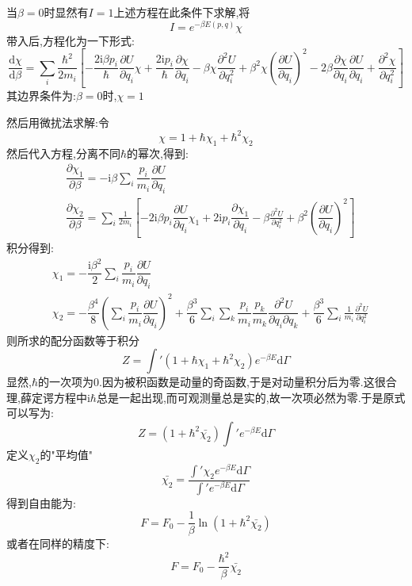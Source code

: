 当$\beta=0$时显然有$I=1$上述方程在此条件下求解,将
\begin{equation}
  I=e^{-\beta E(p,q)} \chi
\end{equation}
带入后,方程化为一下形式:
\begin{equation}
  \dfrac{\mathrm{d}\chi}{\mathrm{d} \beta}=\sum_i \frac{\hbar^{2}}{2m_i}\left[ -\dfrac{2\mathrm{i} \beta p_i}{\hbar}\dfrac{\partial U}{\partial q_i}\chi+\dfrac{2\mathrm{i} p_i}{\hbar}\dfrac{\partial \chi}{\partial q_i}-\beta\chi\frac{\partial^2 U}{\partial q_i^2}+\beta^{2}\chi\left( \dfrac{\partial U}{\partial q_i} \right) ^{2}-2\beta \dfrac{\partial \chi}{\partial q_i}\dfrac{\partial U}{\partial q_i}+\frac{\partial^2 \chi}{\partial q_i^2} \right] 
\end{equation}
其边界条件为:$\beta=0$时,$\chi=1$

然后用微扰法求解:令
\begin{equation}
  \chi=1+\hbar\chi_1+\hbar^{2}\chi_2
\end{equation}
然后代入方程,分离不同$\hbar$的幂次,得到:
\begin{align}
&\dfrac{\partial \chi_1}{\partial \beta}=-\mathrm{i} \beta\sum_i \dfrac{p_i}{m_i}\dfrac{\partial U}{\partial q_i} \\ 
&\dfrac{\partial \chi_2}{\partial \beta}=\sum_i \frac{1}{2m_i}\left[ -2\mathrm{i} \beta p_i \dfrac{\partial U}{\partial q_i}\chi_1+2\mathrm{i} p_i \dfrac{\partial \chi_1}{\partial q_i}-\beta \frac{\partial^2 U}{\partial q_i^2}+\beta^{2} \left( \dfrac{\partial U}{\partial q_i} \right) ^{2} \right]
\end{align}
积分得到:
\begin{align}
&\chi_1=-\dfrac{\mathrm{i} \beta^{2}}{2}\sum_i \dfrac{p_i}{m_i}\dfrac{\partial U}{\partial q_i} \\ 
&\chi_2=-\dfrac{\beta^{4}}{8}\left( \sum_i \dfrac{p_i}{m_i}\dfrac{\partial U}{\partial q_i}
 \right) ^{2}+\dfrac{\beta^{3}}{6}\sum_i \sum_k \dfrac{p_i}{m_i}\dfrac{p_k}{m_k}\dfrac{\partial^{2} U}{\partial q_i \partial q_k}+\dfrac{\beta^{3}}{6}\sum_i \frac{1}{m_i} \frac{\partial^2 U}{\partial q_i^2}
\end{align}
则所求的配分函数等于积分
\begin{equation}
  Z=\int'(1+\hbar \chi_1+\hbar^{2}\chi_2)e^{-\beta E}\mathrm{d} \Gamma
\end{equation}
显然,$\hbar$的一次项为0.因为被积函数是动量的奇函数,于是对动量积分后为零.这很合理,薛定谔方程中$\mathrm{i} \hbar$总是一起出现,而可观测量总是实的,故一次项必然为零.于是原式可以写为:
\begin{equation}
  Z=(1+\hbar^{2}\bar{\chi_2})\int' e^{-\beta E}\mathrm{d} \Gamma
\end{equation}
定义$\chi_2$的"平均值"
\[\bar{\chi_2}=\dfrac{\int'\chi_2 e^{-\beta E}\mathrm{d} \Gamma}{\int' e^{-\beta E}\mathrm{d} \Gamma}\]
得到自由能为:
\begin{equation}
  F=F_0-\frac{1}{\beta}\ln(1+\hbar^{2}\bar{\chi_2})
\end{equation}
或者在同样的精度下:
\begin{equation}
  F=F_0-\dfrac{\hbar^{2}}{\beta}\bar{\chi_2}\label{eq:3.13}
\end{equation}

